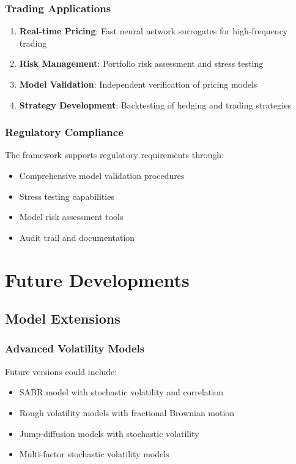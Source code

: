 \documentclass[12pt,a4paper]{article}
\begin{document}
\subsubsection{Trading Applications}

\begin{enumerate}
    \item \textbf{Real-time Pricing}: Fast neural network surrogates for high-frequency trading
    \item \textbf{Risk Management}: Portfolio risk assessment and stress testing
    \item \textbf{Model Validation}: Independent verification of pricing models
    \item \textbf{Strategy Development}: Backtesting of hedging and trading strategies
\end{enumerate}

\subsubsection{Regulatory Compliance}

The framework supports regulatory requirements through:

\begin{itemize}
    \item Comprehensive model validation procedures
    \item Stress testing capabilities
    \item Model risk assessment tools
    \item Audit trail and documentation
\end{itemize}

\section{Future Developments}

\subsection{Model Extensions}

\subsubsection{Advanced Volatility Models}

Future versions could include:

\begin{itemize}
    \item SABR model with stochastic volatility and correlation
    \item Rough volatility models with fractional Brownian motion
    \item Jump-diffusion models with stochastic volatility
    \item Multi-factor stochastic volatility models
\end{itemize}
\end{document}
